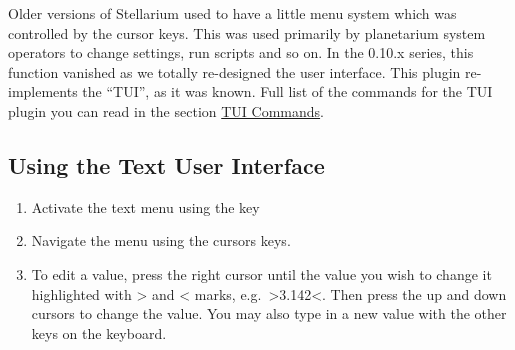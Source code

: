 
Older versions of Stellarium used to have a little menu system which was
controlled by the cursor keys. This was used primarily by planetarium
system operators to change settings, run scripts and so on. In the
0.10.x series, this function vanished as we totally re-designed the user
interface. This plugin re-implements the ``TUI'', as it was known. Full
list of the commands for the TUI plugin you can read in the section
\href{TUI_Commands}{TUI Commands}.

\subsection{Using the Text User Interface}
\label{sec:plugins:TUI:using}

\begin{enumerate}
\item
  Activate the text menu using the  key
\item
  Navigate the menu using the cursors keys.
\item
  To edit a value, press the right cursor until the value you wish to
  change it highlighted with \textgreater{} and \textless{} marks, e.g.\
  \textgreater{}3.142\textless{}. Then press the up and down cursors to
  change the value. You may also type in a new value with the other keys
  on the keyboard.
\end{enumerate}

